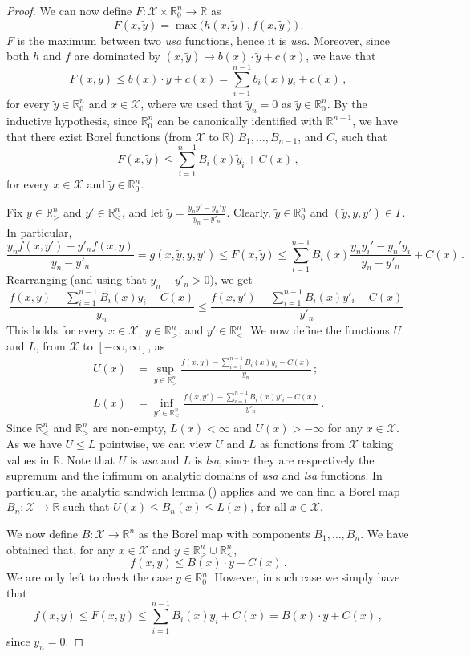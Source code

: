\documentclass[10pt,a4paper]{amsart}
\newcommand{\R}{\mathbb R}
\newcommand{\X}{\mathcal X}
\newcommand{\lsa}{\emph{lsa}\xspace}
\newcommand{\usa}{\emph{usa}\xspace}
\begin{document}
\begin{proof}
    We can now define $F:\X\times \R^n_0\to \R$ as
    $$F(x, \tilde y) = \max\big(h(x,\tilde y),f(x,\tilde y)\big)\,.$$ $F$ is the maximum between two \usa functions, hence it is \usa. Moreover, since both $h$ and $f$ are dominated by $(x,\tilde y)\mapsto b(x)\cdot\tilde y + c(x)$, we have that
    $$F(x,\tilde y) \leq b(x)\cdot \tilde y + c(x) = \sum_{i=1}^{n-1} b_i(x)\tilde y_i + c(x)\,,$$ for every $\tilde y\in \R^n_0$ and $x\in\X$, where we used that $\tilde y_{n} = 0$ as $\tilde y\in \R^n_0$. By the inductive hypothesis, since  $\R^n_0$ can be canonically identified with  $\R^{n-1}$, we have that there exist Borel functions (from $\X$ to $\R$) $B_1,\dots, B_{n-1}$, and $C$, such that
    $$F(x, \tilde y) \leq \sum_{i=1}^{n-1} B_i(x)\tilde y_i + C(x)\,,$$
    for every $x\in\X$ and $\tilde y\in \R^n_0$. 

    Fix $y\in \R^n_>$ and $y'\in \R^n_<$, and let $\tilde y = \frac{y_{n}y' - y_{n}'y}{y_{n}-y'_{n}}$. Clearly, $\tilde y\in \R^n_0$ and $(\tilde y, y,y')\in\Gamma$. In particular,
    $$\frac{y_{n}f(x,y') - y'_{n}f(x,y)}{y_{n}-y'_{n}}= g(x, \tilde y, y, y')\leq F(x,\tilde y) \leq \sum_{i=1}^{n-1}B_i(x)\frac{y_{n}y_i' - y_{n}'y_i}{y_{n}-y'_{n}} + C(x)\,.$$
    Rearranging (and using that $y_{n}-y'_{n}>0$), we get
    $$\frac{f(x,y)-\sum_{i=1}^{n-1} B_i(x)y_i -C(x)}{y_{n}}\leq \frac{f(x,y')-\sum_{i=1}^{n-1} B_i(x)y'_i-C(x)}{y'_{n}}\,.$$
    This holds for every $x\in\X$, $y\in \R^n_>$, and $y'\in \R^n_<$. We now define the functions $U$ and $L$, from $\X$ to $[-\infty,\infty]$, as
    \begin{align*}U(x) &= \sup_{y\in \R^n_>}\frac{f(x,y)-\sum_{i=1}^{n-1} B_i(x)y_i -C(x)}{y_{n}}\,;\\ L(x) &= \inf_{y'\in \R^n_<}\frac{f(x,y')-\sum_{i=1}^{n-1} B_i(x)y'_i-C(x)}{y'_{n}}\,.\end{align*} Since $\R^n_<$ and $\R^n_>$ are non-empty, $L(x)<\infty$ and $U(x)>-\infty$ for any $x\in\X$. As we have $U\leq L$ pointwise, we can view $U$ and $L$ as functions from $\X$ taking values in $\R$. Note that $U$ is \usa and $L$ is \lsa, since they are respectively the supremum and the infimum on analytic domains of \usa and \lsa functions. In particular, the analytic sandwich lemma () applies and we can find a Borel map $B_n:\X\to\R$ such that $U(x)\leq B_n(x)\leq L(x)$, for all $x\in\X$. 
    
    We now define $B:\X\to\R^n$ as the Borel map with components $B_1,\dots, B_n$. We have  obtained that, for any $x\in\X$ and $y\in \R^n_>\cup \R^n_<$, 
    $$f(x,y) \leq B(x)\cdot y + C(x)\,.$$ We are only left to check the case $y\in \R^n_0$. However, in such case we simply have that
    $$f(x,y)\leq F(x,y)\leq \sum_{i=1}^{n-1} B_i(x) y_i +C(x) = B(x)\cdot y + C(x)\,,$$ since $y_{n}=0$.
\end{proof}
\end{document}

